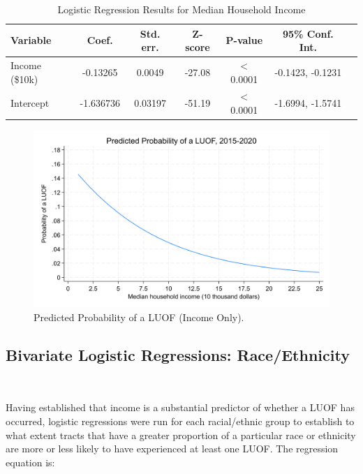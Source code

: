 \documentclass[12pt]{article}
\begin{document}
\begin{table}[ht]
\centering
\begin{tabular}{lcccccc}
\toprule
\textbf{Variable} & \textbf{Coef.} & \textbf{Std. err.} & \textbf{Z-score} & \textbf{P-value} & \textbf{95\% Conf. Int.} \\
\midrule
Income (\$10k) & -0.13265 & 0.0049 & -27.08 & $<$0.0001 & -0.1423, -0.1231 \\
Intercept & -1.636736 & 0.03197 & -51.19 & $<$0.0001 & -1.6994, -1.5741 \\
\bottomrule
\end{tabular}
\caption{Logistic Regression Results for Median Household Income}
\label{tab:income_logit}
\end{table}
\begin{figure}[H]
  \centering %
  \includegraphics[width=\linewidth]{images/LUOF_logit_income_only}
  \captionsetup{justification=centering, singlelinecheck=false, margin=2cm}
  \caption[Predicted Probability of a LUOF (Income Only)]{Predicted Probability of a LUOF (Income Only).}
  \label{fig:logit_income_plot}
\end{figure}


\subsection{Bivariate Logistic Regressions: Race/Ethnicity}\

Having established that income is a substantial predictor of whether a LUOF has occurred, logistic regressions were run for each racial/ethnic group to establish to what extent tracts that have a greater proportion of a particular race or ethnicity are more or less likely to have experienced at least one LUOF. The regression equation is:
\end{document}
